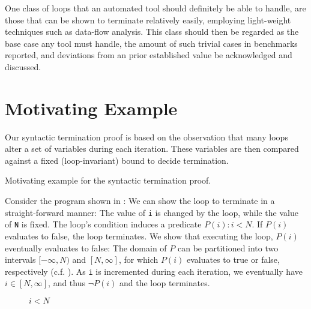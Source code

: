 One class of loops that an automated tool should definitely be able to handle, are those that can be shown to terminate relatively easily, employing light-weight techniques such as data-flow analysis. This class should then be regarded as the base case any tool must handle, the amount of such trivial cases in benchmarks reported, and deviations from an prior established value be acknowledged and discussed.

\section{Motivating Example}

Our syntactic termination proof is based on the observation that many loops alter a set of variables during each iteration. These variables are then compared against a fixed (loop-invariant) bound to decide termination.

\begin{listing}[h]
    \caption{Motivating example for the syntactic termination proof.}
    \label{fig:listing_posneg}
\end{listing}

Consider the program shown in : We can show the loop to terminate in a straight-forward manner: The value of \texttt{i} is changed by the loop, while the value of \texttt{N} is fixed. The loop's condition induces a predicate $P(i): i < N$. If $P(i)$ evaluates to false, the loop terminates. We show that executing the loop, $P(i)$ eventually evaluates to false: The domain of $P$ can be partitioned into two intervals $[-\infty, N)$ and $[N, \infty]$, for which $P(i)$ evaluates to true or false, respectively (c.f. ). As \texttt{i} is incremented during each iteration, we eventually have $i \in [N, \infty]$, and thus $\neg P(i)$ and the loop terminates.

\begin{figure}[h]
\caption{$i < N$}
\label{fig:i_lt_N}
\end{figure}

